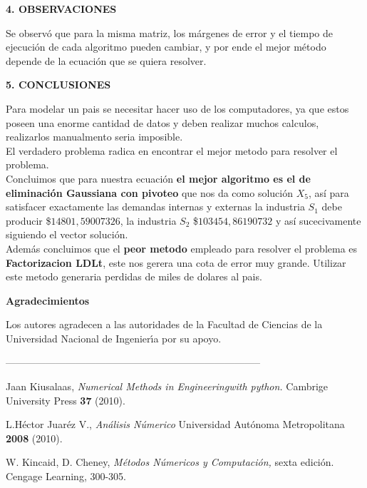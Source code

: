 \documentclass[10pt,a4paper]{article}
\begin{document}
\begin{multicols}{2}
\begin{center}
{\large \bf 4. OBSERVACIONES}
\end{center}
Se observó que para la misma matriz, los márgenes de error y el tiempo de ejecución de cada algoritmo pueden cambiar, y por ende el mejor método depende de la ecuación que se quiera resolver.\\
\begin{center}
{\large \bf 5. CONCLUSIONES}
\end{center}
Para modelar un pais se necesitar hacer uso de los computadores, ya que estos poseen una enorme cantidad de datos y deben realizar muchos calculos, realizarlos manualmento seria imposible.\\
El verdadero problema radica en encontrar el mejor metodo para resolver el problema.\\
Concluimos que para nuestra ecuación \textbf{el mejor algoritmo es el de eliminación Gaussiana con pivoteo} que nos da como solución $X_5$, así para satisfacer exactamente las demandas internas y externas la industria $S_1$ debe producir  \$$14801,59007326$, la  industria $S_2$ \$$103454,86190732$ y así sucecivamente siguiendo el vector solución.\\
Además concluimos que el \textbf{peor metodo} empleado para resolver el problema es \textbf{Factorizacion LDLt}, este nos gerera una cota de error muy grande. Utilizar este metodo generaria perdidas de miles de dolares al pais.

\begin{center}
{\large \bf Agradecimientos}
\end{center}
Los autores agradecen a las autoridades de la Facultad de Ciencias de la Universidad Nacional de 
Ingenier\'{\i}a por su apoyo.

\end{multicols}

\begin{center}
 -----------------------------------------------------------------------------
\end{center}
\begin{multicols}{2}
\begin{list}{}{\setlength{\topsep}{0mm}\setlength{\itemsep}{0mm}%
\setlength{\parsep}{0mm}\setlength{\leftmargin}{4mm}}
%
\small
\item[1.] Jaan Kiusalaas, \textit{Numerical Methods in Engineering\linebreak with python.} Cambrige University Press \textbf{37} (2010).
\item[2.] L.Héctor Juaréz V., \textit{Análisis Númerico} Universidad Autónoma Metropolitana \textbf{2008} (2010).
\item[3.] W. Kincaid, D. Cheney, \textit{Métodos Númericos y Computación,} sexta edición. Cengage Learning, 300-305.
%
\end{list}
\end{multicols}
\end{document}
